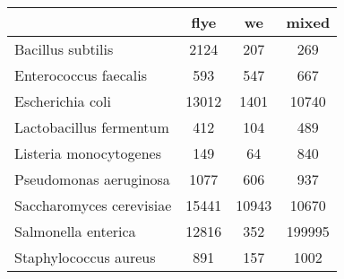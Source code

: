 \begin{minipage}{0.91\textwidth}
\begin{adjustbox}{center}
\begin{tabular}{|l||c|c|c|}
\hline
 & flye & we & mixed \\
\hline
\hline
Bacillus subtilis & \cellcolor[RGB]{235, 71, 71} 2124 & \cellcolor[RGB]{227, 227, 252} 207 & \cellcolor[RGB]{241, 241, 253} 269 \\
\hline
Enterococcus faecalis & \cellcolor[RGB]{241, 241, 253} 593 & \cellcolor[RGB]{227, 227, 252} 547 & \cellcolor[RGB]{253, 241, 241} 667 \\
\hline
Escherichia coli & \cellcolor[RGB]{253, 237, 237} 13012 & \cellcolor[RGB]{218, 218, 251} 1401 & \cellcolor[RGB]{255, 255, 255} 10740 \\
\hline
Lactobacillus fermentum & \cellcolor[RGB]{250, 250, 254} 412 & \cellcolor[RGB]{223, 223, 251} 104 & \cellcolor[RGB]{254, 250, 250} 489 \\
\hline
Listeria monocytogenes & \cellcolor[RGB]{237, 237, 253} 149 & \cellcolor[RGB]{232, 232, 252} 64 & \cellcolor[RGB]{252, 232, 232} 840 \\
\hline
Pseudomonas aeruginosa & \cellcolor[RGB]{252, 227, 227} 1077 & \cellcolor[RGB]{218, 218, 251} 606 & \cellcolor[RGB]{255, 255, 255} 937 \\
\hline
Saccharomyces cerevisiae & \cellcolor[RGB]{235, 71, 71} 15441 & \cellcolor[RGB]{253, 237, 237} 10943 & \cellcolor[RGB]{237, 237, 253} 10670 \\
\hline
Salmonella enterica & \cellcolor[RGB]{232, 232, 252} 12816 & \cellcolor[RGB]{232, 232, 252} 352 & \cellcolor[RGB]{252, 232, 232} 199995 \\
\hline
Staphylococcus aureus & \cellcolor[RGB]{250, 250, 254} 891 & \cellcolor[RGB]{218, 218, 251} 157 & \cellcolor[RGB]{254, 250, 250} 1002 \\
\hline
\end{tabular}
\end{adjustbox}
\end{minipage}
